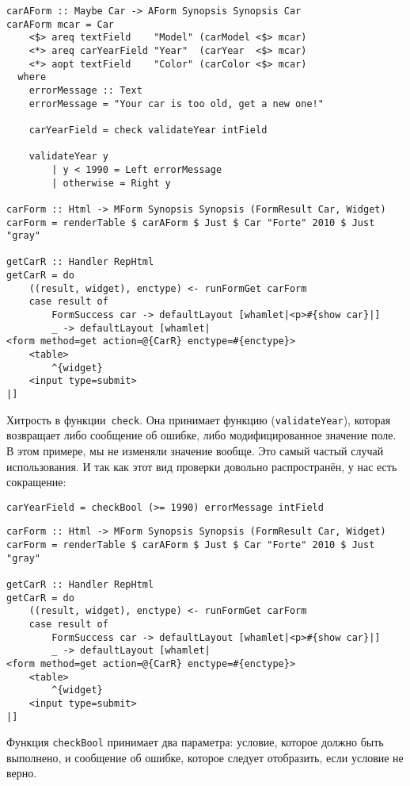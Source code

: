 \begin{lstlisting}
carAForm :: Maybe Car -> AForm Synopsis Synopsis Car
carAForm mcar = Car
    <$> areq textField    "Model" (carModel <$> mcar)
    <*> areq carYearField "Year"  (carYear  <$> mcar)
    <*> aopt textField    "Color" (carColor <$> mcar)
  where
    errorMessage :: Text
    errorMessage = "Your car is too old, get a new one!"

    carYearField = check validateYear intField

    validateYear y
        | y < 1990 = Left errorMessage
        | otherwise = Right y

carForm :: Html -> MForm Synopsis Synopsis (FormResult Car, Widget)
carForm = renderTable $ carAForm $ Just $ Car "Forte" 2010 $ Just "gray"

getCarR :: Handler RepHtml
getCarR = do
    ((result, widget), enctype) <- runFormGet carForm
    case result of
        FormSuccess car -> defaultLayout [whamlet|<p>#{show car}|]
        _ -> defaultLayout [whamlet|
<form method=get action=@{CarR} enctype=#{enctype}>
    <table>
        ^{widget}
    <input type=submit>
|]
\end{lstlisting}

Хитрость в функции~\lstinline'check'. Она принимает функцию
(\lstinline'validateYear'), которая возвращает либо сообщение об ошибке, либо
модифицированное значение поле. В этом примере, мы не изменяли значение
вообще. Это самый частый случай использования. И так как этот вид проверки
довольно распространён, у нас есть сокращение:

\begin{lstlisting}
carYearField = checkBool (>= 1990) errorMessage intField
\end{lstlisting}

\begin{lstlisting}
carForm :: Html -> MForm Synopsis Synopsis (FormResult Car, Widget)
carForm = renderTable $ carAForm $ Just $ Car "Forte" 2010 $ Just "gray"

getCarR :: Handler RepHtml
getCarR = do
    ((result, widget), enctype) <- runFormGet carForm
    case result of
        FormSuccess car -> defaultLayout [whamlet|<p>#{show car}|]
        _ -> defaultLayout [whamlet|
<form method=get action=@{CarR} enctype=#{enctype}>
    <table>
        ^{widget}
    <input type=submit>
|]
\end{lstlisting}

Функция \lstinline'checkBool' принимает два параметра: условие, которое должно
быть выполнено, и сообщение об ошибке, которое следует отобразить, если
условие не верно.

